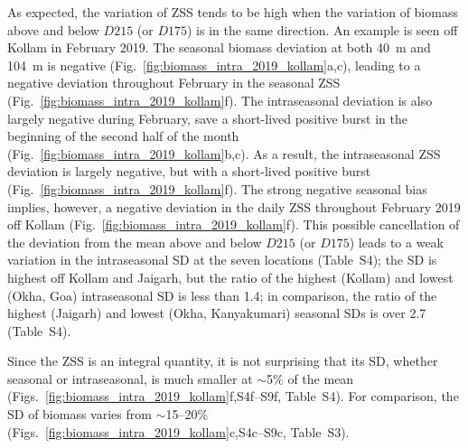 \documentclass[authoryear,review,11pt]{elsarticle}
\newcommand{\chla}{chl-{\emph{a}}}
\begin{document}
As expected, the variation of ZSS tends to be high when the variation of biomass above and below $D215$ (or $D175$) is in the same direction. An example is seen off Kollam in February 2019.  The seasonal biomass deviation at both 40~m and 104~m is negative (Fig.~\ref{fig:biomass_intra_2019_kollam}a,c), leading to a negative deviation throughout February in the seasonal ZSS (Fig.~\ref{fig:biomass_intra_2019_kollam}f).  The intraseasonal deviation is also largely negative during February, save a short-lived positive burst in the beginning of the second half of the month (Fig.~\ref{fig:biomass_intra_2019_kollam}b,c).  As a result, the intraseasonal ZSS deviation is largely negative, but with a short-lived positive burst (Fig.~\ref{fig:biomass_intra_2019_kollam}f). The strong negative seasonal bias implies, however, a negative deviation in the daily ZSS throughout February 2019 off Kollam (Fig.~\ref{fig:biomass_intra_2019_kollam}f).  This possible cancellation of the deviation from the mean above and below $D215$ (or $D175$) leads to a weak variation in the intraseasonal SD at the seven locations (Table~S4); the SD is highest off Kollam and Jaigarh, but the ratio of the highest (Kollam) and lowest (Okha, Goa) intraseasonal SD is less than 1.4; in comparison, the ratio of the highest (Jaigarh) and lowest (Okha, Kanyakumari) seasonal SDs is over 2.7 (Table~S4).

Since the ZSS is an integral quantity, it is not surprising that its SD, whether seasonal or intraseasonal, is much smaller at $\sim$5\% of the mean (Figs.~\ref{fig:biomass_intra_2019_kollam}f,S4f--S9f, Table~S4). For comparison, the SD of biomass varies from $\sim$15--20\% (Figs.~\ref{fig:biomass_intra_2019_kollam}c,S4c--S9c, Table~S3).





\end{document}

